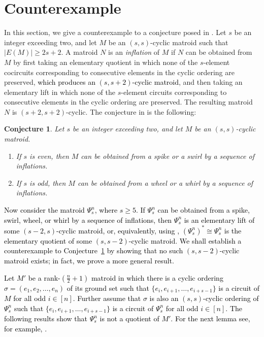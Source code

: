 \documentclass[11pt]{amsart}
\newtheorem{conjecture}[theorem]{Conjecture}
\newcommand{\bloo}{\textcolor{black}}
\begin{document}
\section{Counterexample}
\label{counterexample}

In this section, we give a counterexample to a conjecture posed in \cite{bre19b}. Let $s$ be an integer exceeding two, and let $M$ be an $(s, s)$-cyclic matroid such that $|E(M)|\ge 2s+2$. A matroid $N$ is an {\em inflation} of $M$ if $N$ can be obtained from $M$ by first taking an elementary quotient in which none of the $s$-element cocircuits corresponding to consecutive elements in the cyclic ordering are preserved, \bloo{which produces an $(s,s+2)$-cyclic matroid}, and then taking an elementary lift in which none of the $s$-element circuits corresponding to consecutive elements in the cyclic ordering are preserved. The resulting matroid $N$ is $(s+2, s+2)$-cyclic. The conjecture in \cite[Conjecture~6.1]{bre19b} is the following:

\begin{conjecture}
Let $s$ be an integer exceeding two, and let $M$ be an $(s, s)$-cyclic matroid.
\begin{enumerate}[{\rm (i)}]
\item If $s$ is even, then $M$ can be obtained from a spike or a swirl by a sequence of inflations.

\item If $s$ is odd, then $M$ can be obtained from a wheel or a whirl by a sequence of inflations.
\end{enumerate}
\label{conjecture}
\end{conjecture}

\bloo{Now consider the matroid $\Psi^n_s$, where $s\ge 5$. If $\Psi^n_s$ can be obtained from a spike, swirl, wheel, or whirl by a sequence of inflations, then $\Psi^n_s$ is an elementary lift of some $(s-2,s)$-cyclic matroid, or, equivalently, using , $(\Psi^n_s)^* \cong \Psi^n_s$ is the elementary quotient of some $(s,s-2)$-cyclic matroid. We shall establish a counterexample to Conjecture~\ref{conjecture} by showing that no such $(s,s-2)$-cyclic matroid exists; in fact, we prove a more general result.}

\bloo{Let $M'$ be a rank-$(\frac{n}{2}+1)$ matroid in which there is a cyclic ordering $\left.\sigma=(e_1, e_2, \ldots, e_n)\right.$ of its ground set such that $\{e_i, e_{i+1}, \ldots, e_{i+s-1}\}$ is a circuit of $M$ for all odd $i\in [n]$. Further assume that $\sigma$ is also an $(s,s)$-cyclic ordering of $\Psi^n_s$ such that $\{e_i,e_{i+1},\ldots,e_{i+s-1}\}$ is a circuit of $\Psi^n_s$ for all odd $i \in [n]$. The following results show that $\Psi^n_s$ is not a quotient of $M'$. For the next lemma see, for example, \cite[Proposition 7.3.6]{ox11}.}
\end{document}
